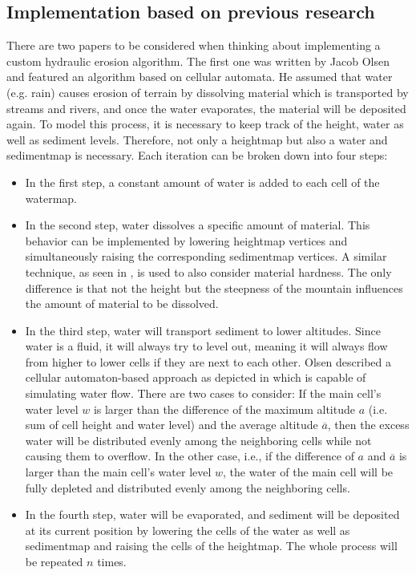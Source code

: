 \documentclass[11pt,a4paper,twoside,openright]{report}
\begin{document}
\subsection{Implementation based on previous research}
There are two papers to be considered when thinking about implementing a custom hydraulic erosion algorithm. The first one \cite{Olsen:2004} was written by Jacob Olsen and featured an algorithm based on cellular automata. He assumed that water (e.g. rain) causes erosion of terrain by dissolving material which is transported by streams and rivers, and once the water evaporates, the material will be deposited again. To model this process, it is necessary to keep track of the height, water as well as sediment levels. Therefore, not only a heightmap but also a water and sedimentmap is necessary. Each iteration can be broken down into four steps:
\begin{itemize}
\item In the first step, a constant amount of water is added to each cell of the watermap.
\item In the second step, water dissolves a specific amount of material. This behavior can be implemented by lowering heightmap vertices and simultaneously raising the corresponding sedimentmap vertices. A similar technique, as seen in , is used to also consider material hardness. The only difference is that not the height but the steepness of the mountain influences the amount of material to be dissolved.
\item In the third step, water will transport sediment to lower altitudes. Since water is a fluid, it will always try to level out, meaning it will always flow from higher to lower cells if they are next to each other. Olsen described a cellular automaton-based approach as depicted in  which is capable of simulating water flow. There are two cases to consider: If the main cell's water level $w$ is larger than the difference of the maximum altitude $a$ (i.e. sum of cell height and water level) and the average altitude $\overline{a}$, then the excess water will be distributed evenly among the neighboring cells while not causing them to overflow. In the other case, i.e., if the difference of $a$ and $\overline{a}$ is larger than the main cell's water level $w$, the water of the main cell will be fully depleted and distributed evenly among the neighboring cells.
\item In the fourth step, water will be evaporated, and sediment will be deposited at its current position by lowering the cells of the water as well as sedimentmap and raising the cells of the heightmap. The whole process will be repeated $n$ times.
\end{itemize}
\end{document}
